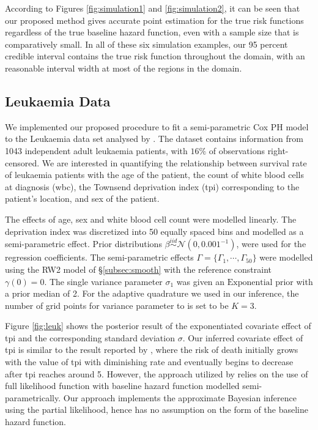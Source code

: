 \documentclass[ba]{imsart}
\begin{document}
According to Figures \ref{fig:simulation1} and \ref{fig:simulation2}, it can be seen that our proposed method gives accurate point estimation for the true risk functions regardless of the true baseline hazard function, even with a sample size that is comparatively small. In all of these six simulation examples, our 95 percent credible interval contains the true risk function throughout the domain, with an reasonable interval width at most of the regions in the domain. 

\subsection{Leukaemia Data}\label{subsec:leuk}

We implemented our proposed procedure to fit a semi-parametric Cox PH model to the Leukaemia data set analysed by \cite{inlacoxph}. The dataset contains information from 1043 independent adult leukaemia patients, with $16\%$ of observations right-censored. We are interested in quantifying the relationship between survival rate of leukaemia patients with the age of the patient, the count of white blood cells at diagnosis (wbc), the Townsend deprivation index (tpi) corresponding to the patient's location, and sex of the patient.

The effects of age, sex and white blood cell count were modelled linearly. The deprivation index was discretized into 50 equally spaced bins and modelled as a semi-parametric effect. Prior distributions $\beta \stackrel{iid}{\sim} \mathcal{N}(0, 0.001^{-1})$, were used for the regression coefficients. The semi-parametric effects $\Gamma = \{\Gamma_{1}, \cdots, \Gamma_{50}\}$ were modelled using the RW2 model of \S\ref{subsec:smooth} with the reference constraint $\gamma(0) = 0$. The single variance parameter $\sigma_{1}$ was given an $\text{Exponential}$ prior with a prior median of 2. For the adaptive quadrature we used in our inference, the number of grid points for variance parameter to is set to be $K = 3$.

Figure \ref{fig:leuk} shows the posterior result of the exponentiated covariate effect of tpi and the corresponding standard deviation $\sigma$. Our inferred covariate effect of tpi is similar to the result reported by \cite{inlacoxph}, where the risk of death initially grows with the value of tpi with diminishing rate and eventually begins to decrease after tpi reaches around 5. However, the approach utilized by \cite{inlacoxph} relies on the use of full likelihood function with baseline hazard function modelled semi-parametrically. Our approach implements the approximate Bayesian inference using the partial likelihood, hence has no assumption on the form of the baseline hazard function. 
\end{document}
